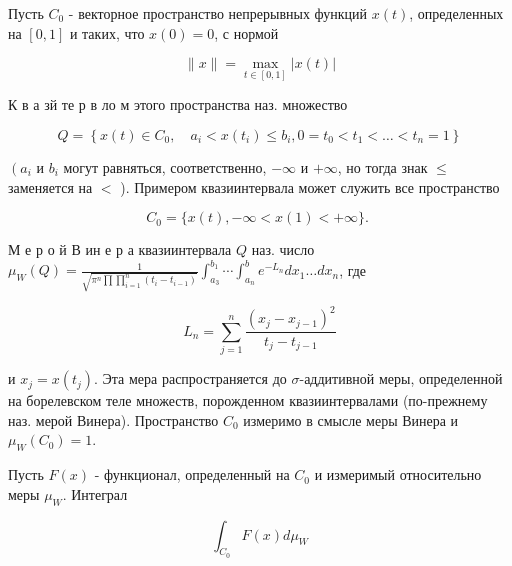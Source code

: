 \documentclass[10pt]{article}
\begin{document}
Пусть $C_{0}$ - векторное пространство непрерывных функций $x(t)$, определенных на $[0,1]$ и таких, что $x(0)=0$, с нормой



\[

\|x\|=\max _{t \in[0,1]}|x(t)|

\]



К в а зй те р в ло м этого пространства наз. множество



\[

Q=\left\{x(t) \in C_{0}, \quad a_{i}<x\left(t_{i}\right) \leqslant b_{i}, 0=t_{0}<t_{1}<\ldots<t_{n}=1\right\}

\]



$\left(a_{i}\right.$ и $b_{i}$ могут равняться, соответственно, $-\infty$ и $+\infty$, но тогда знак $\leqslant$ заменяется на $<$ ). Примером квазиинтервала может служить все пространство



\[

C_{0}=\{x(t),-\infty<x(1)<+\infty\} \text {. }

\]



М е р о й В ин е р а квазиинтервала $Q$ наз. число $\mu_{W}(Q)=\frac{1}{\sqrt{\pi^{n} \prod \prod_{i=1}^{n}\left(t_{i}-t_{i-1}\right)}} \int_{a_{3}}^{b_{1}} \cdots \int_{a_{n}}^{b} e^{-L_{n}} d x_{1} \ldots d x_{n}$, где



\[

L_{n}=\sum_{j=1}^{n} \frac{\left(x_{j}-x_{j-1}\right)^{2}}{t_{j}-t_{j-1}}

\]



и $x_{j}=x\left(t_{j}\right)$. Эта мера распространяется до $\sigma$-аддитивной меры, определенной на борелевском теле множеств, порожденном квазиинтервалами (по-прежнему наз. мерой Винера). Пространство $C_{0}$ измеримо в смысле меры Винера и $\mu_{W}\left(C_{0}\right)=1$.



Пусть $F(x)$ - функционал, определенный на $C_{0}$ и измеримый относительно меры $\mu_{W}$. Интеграл



\[

\int_{C_{0}} F(x) d \mu_{W}

\]
\end{document}
